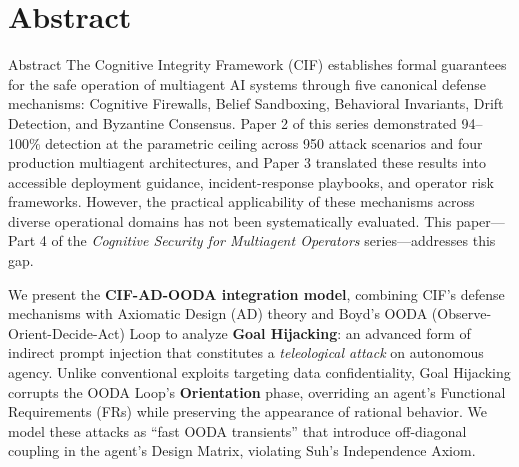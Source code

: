 \documentclass[
  ignorenonframetext,
]{beamer}
\author{\texorpdfstring{}{}}
\date{}
\begin{document}
\section{Abstract}\label{abstract}

\begin{frame}[allowframebreaks]{Abstract}
The Cognitive Integrity Framework (CIF) \cite{friedman2026cogsec1}
establishes formal guarantees for the safe operation of multiagent AI
systems through five canonical defense mechanisms: Cognitive Firewalls,
Belief Sandboxing, Behavioral Invariants, Drift Detection, and Byzantine
Consensus. Paper 2 of this series \cite{friedman2026cogsec2}
demonstrated 94--100\% detection at the parametric ceiling across 950
attack scenarios and four production multiagent architectures, and Paper
3 \cite{friedman2026cogsec3} translated these results into accessible
deployment guidance, incident-response playbooks, and operator risk
frameworks. However, the practical applicability of these mechanisms
across diverse operational domains has not been systematically
evaluated. This paper---Part 4 of the \emph{Cognitive Security for
Multiagent Operators} series---addresses this gap.

We present the \textbf{CIF-AD-OODA integration model}, combining CIF's
defense mechanisms with Axiomatic Design (AD) theory
\cite{suh2001axiomatic} and Boyd's OODA (Observe-Orient-Decide-Act) Loop
\cite{boyd1987patterns} to analyze \textbf{Goal Hijacking}: an advanced
form of indirect prompt injection that constitutes a \emph{teleological
attack} on autonomous agency. Unlike conventional exploits targeting
data confidentiality, Goal Hijacking corrupts the OODA Loop's
\textbf{Orientation} phase, overriding an agent's Functional
Requirements (FRs) while preserving the appearance of rational behavior.
We model these attacks as ``fast OODA transients'' that introduce
off-diagonal coupling in the agent's Design Matrix, violating Suh's
Independence Axiom.


\end{frame}
\end{document}
